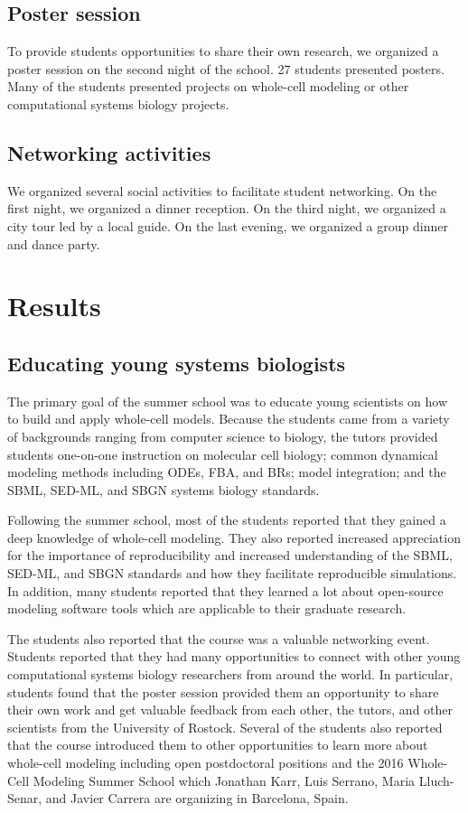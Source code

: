 \documentclass[journal,transmag]{IEEEtran}
\newcommand{\comment}[3]{\pdfmarkupcomment[markup=Highlight,color=yellow,author={#2}]{#1}{#3}}
\begin{document}
\subsection{Poster session}
To provide students opportunities to share their own research, we organized a poster session on the second night of the school. 
27 students presented posters. Many of the students presented projects on whole-cell modeling or other computational systems biology projects.

\subsection{Networking activities}
We organized several social activities to facilitate student networking. On the first night, we organized a dinner reception. On the third night, we organized a city tour led by a local guide. On the last evening, we organized a group dinner and dance party.

\section{Results}

\subsection{Educating young systems biologists}
The primary goal of the summer school was to educate young scientists on how to build and apply whole-cell models. Because the students came from a variety of backgrounds ranging from computer science to biology, the tutors provided students one-on-one instruction on molecular cell biology; common dynamical modeling methods including ODEs, FBA, and BRs; model integration; and the SBML, SED-ML, and SBGN systems biology standards.

Following the summer school, %
most of the %
students reported that they gained a deep knowledge of whole-cell modeling. 
They  also reported increased appreciation for the importance of reproducibility and increased understanding of the SBML, SED-ML, and SBGN standards and how they facilitate reproducible simulations.
In addition, many students reported that they learned a lot about open-source modeling software tools which are applicable to their graduate research.

The students also reported that the course was a valuable networking event. 
Students reported that they had many opportunities to connect with other young computational systems biology researchers from around the world.
In particular, students found that the poster session provided them an opportunity to share their own work and get valuable feedback from each other, the tutors, and other scientists from the University of Rostock.
Several of the students also reported that the course introduced them to other opportunities to learn more about whole-cell modeling including open postdoctoral positions and the 2016 Whole-Cell Modeling Summer School which Jonathan Karr, Luis Serrano, Maria Lluch-Senar, and Javier Carrera are organizing in Barcelona, Spain.
\end{document}
